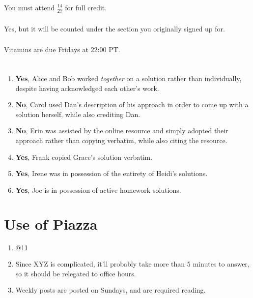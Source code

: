 \documentclass{article}
\begin{document}
You must attend \(\frac{14}{27}\) for full credit.

\subsubsection{}

Yes, but it will be counted under the section you originally signed up for.

\subsubsection{}

Vitamins are due Fridays at 22:00 PT.

\section{}

\begin{enumerate}
    \item \textbf{Yes}, Alice and Bob worked \emph{together} on a solution rather than individually, despite having acknowledged each other's work.
    \item \textbf{No}, Carol used Dan's description of his approach in order to come up with a solution herself, while also crediting Dan.
    \item \textbf{No}, Erin was assisted by the online resource and simply adopted their approach rather than copying verbatim, while also citing the resource.
    \item \textbf{Yes}, Frank copied Grace's solution verbatim.
    \item \textbf{Yes}, Irene was in possession of the entirety of Heidi's solutions.
    \item \textbf{Yes}, Joe is in possession of active homework solutions.
\end{enumerate}

\section{Use of Piazza}

\begin{enumerate}
    \item @11
    \item Since XYZ is complicated, it'll probably take more than 5 minutes to answer, so it should be relegated to office hours.
    \item Weekly posts are posted on Sundays, and are required reading.
\end{enumerate}
\end{document}

